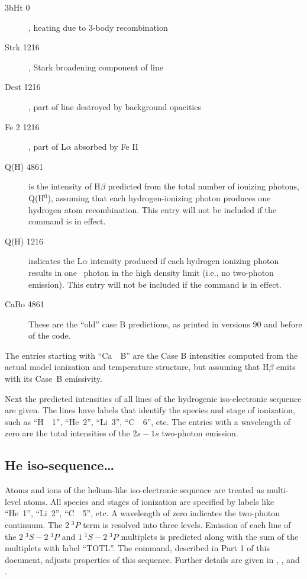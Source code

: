 \begin{description}
\item[3bHt    0], heating due to 3-body recombination

\item[Strk 1216], Stark broadening component of line

\item[Dest 1216], part of line destroyed by background opacities

\item[Fe 2 1216], part of L$\alpha $ absorbed by Fe II

\item[Q(H) 4861] is the intensity of H$\beta$ predicted from the total number of
ionizing photons, Q(H$^0$), assuming that each hydrogen-ionizing photon produces
one hydrogen atom recombination. This entry will not be included if the 
command is in effect.

\item[Q(H) 1216] indicates the L$\alpha $ intensity produced if each hydrogen ionizing
photon results in one \la\  photon in the high density limit (i.e., no
two-photon emission). This entry will not be included if the 
command is in effect.

\item[CaBo 4861] These are the ``old'' case B predictions, as printed in versions
90 and before of the code.
\end{description}

 The entries starting with ``Ca~~B''
are the Case B intensities
computed from the actual model ionization and temperature structure, but
assuming that H$\beta$ emits with its Case~B emissivity.

Next the predicted intensities of all lines of the hydrogenic
iso-electronic sequence are given.
The lines have labels that identify
the species and stage of ionization,
such as ``H~~1'', ``He~2'', ``Li~3'', ``C~~6'', etc.
The entries with a wavelength of zero are the total intensities
of the $2s-1s$ two-photon emission.

\subsection{He iso-sequence\dots }

Atoms and ions of the helium-like iso-electronic sequence are treated
as multi-level atoms.  All species and stages of ionization are specified
by labels like ``He~1'', ``Li~2'', ``C~~5'', etc.
A wavelength of zero indicates the
two-photon continuum.
The $2\;^3P$ term is resolved into three levels.
Emission of
each line of the $2\;^3S - 2\;^3P$ and $1\;^1S - 2\;^3P$ multiplets
is predicted along with the sum of
the multiplets with label ``TOTL''.
The  command, described in Part 1 of
this document, adjusts properties of this sequence.
Further details are
given in \citet{Bauman2005}, \citet{Porter2005}, and \citet{PorterFerland2007}.

